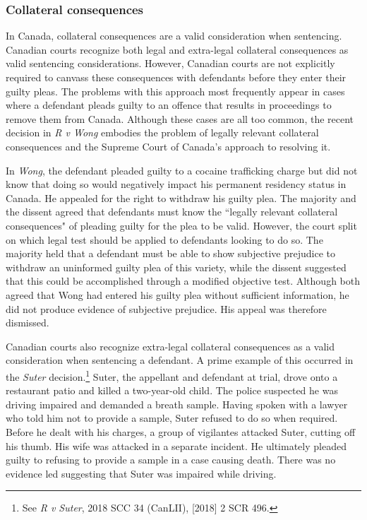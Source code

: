 \subsubsection{Collateral consequences}

In Canada, collateral consequences are a valid consideration when sentencing. Canadian courts recognize both legal and extra-legal collateral consequences as valid sentencing considerations. However, Canadian courts are not explicitly required to canvass these consequences with defendants before they enter their guilty pleas. The problems with this approach most frequently appear in cases where a defendant pleads guilty to an offence that results in proceedings to remove them from Canada. Although these cases are all too common, the recent decision in \textit{R v Wong} embodies the problem of legally relevant collateral consequences and the Supreme Court of Canada's approach to resolving it.

In \textit{Wong}, the defendant pleaded guilty to a cocaine trafficking charge but did not know that doing so would negatively impact his permanent residency status in Canada. He appealed for the right to withdraw his guilty plea. The majority and the dissent agreed that defendants must know the ``legally relevant collateral consequences" of pleading guilty for the plea to be valid. However, the court split on which legal test should be applied to defendants looking to do so. The majority held that a defendant must be able to show subjective prejudice to withdraw an uninformed guilty plea of this variety, while the dissent suggested that this could be accomplished through a modified objective test. Although both agreed that Wong had entered his guilty plea without sufficient information, he did not produce evidence of subjective prejudice. His appeal was therefore dismissed.

Canadian courts also recognize extra-legal collateral consequences as a valid consideration when sentencing a defendant. A prime example of this occurred in the \textit{Suter} decision.\footnote{See \textit{R v Suter}, 2018 SCC 34 (CanLII), [2018] 2 SCR 496.} Suter, the appellant and defendant at trial, drove onto a restaurant patio and killed a two-year-old child. The police suspected he was driving impaired and demanded a breath sample. Having spoken with a lawyer who told him not to provide a sample, Suter refused to do so when required. Before he dealt with his charges, a group of vigilantes attacked Suter, cutting off his thumb. His wife was attacked in a separate incident. He ultimately pleaded guilty to refusing to provide a sample in a case causing death. There was no evidence led suggesting that Suter was impaired while driving.

